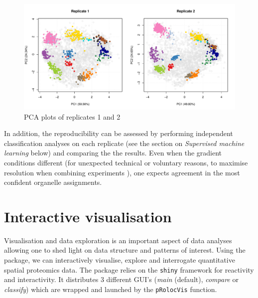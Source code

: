 \begin{figure}[!ht]
  \centering
\begin{knitrout}
\color{fgcolor}\begin{kframe}
\begin{alltt}
\hlstd{(} \hlstd{=} \hlstd{(}\hlstd{,} \hlstd{))}
\hlstd{(hl[, hl}\hlopt{$} \hlopt{==} \hlstd{],}  \hlstd{=} \hlstd{)}
\hlstd{(hl[, hl}\hlopt{$} \hlopt{==} \hlstd{],}  \hlstd{=} \hlstd{,}  \hlstd{=} \hlstd{)}
\end{alltt}
\end{kframe}
\includegraphics[width=\textwidth]{figure/plot2Drep-1} 

\end{knitrout}
  \caption{PCA plots of replicates 1 and 2}
  \label{fig:plot2Drep}
\end{figure}

In addition, the reproducibility can be assessed by performing
independent classification analyses on each replicate (see the section
on \textit{Supervised machine learning} below) and comparing the the
results. Even when the gradient conditions different (for unexpected
technical or voluntary reasons, to maximise resolution when combining
experiments \cite{Trotter:2010}), one expects agreement in the most
confident organelle assignments.

\pagebreak

\section*{Interactive visualisation}

Visualisation and data exploration is an important aspect of data
analyses allowing one to shed light on data structure and patterns of
interest. Using the  package, we can interactively
visualise, explore and interrogate quantitative spatial proteomics
data. The  package relies on the \texttt{shiny}
framework for reactivity and interactivity. It distributes 3 different
GUI's (\textit{main} (default), \textit{compare} or \textit{classify})
which are wrapped and launched by the \texttt{pRolocVis} function.

